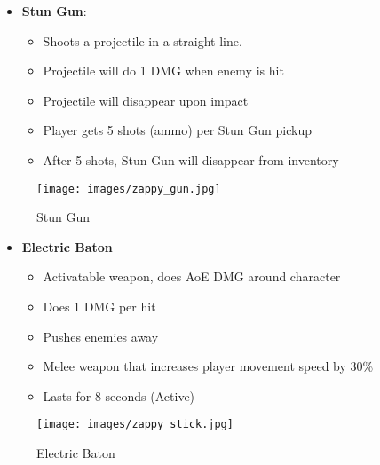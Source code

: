 \documentclass[10pt]{report}
\begin{document}
\begin{minipage}{.8\linewidth}
    \begin{itemize}
        \item \textbf{Stun Gun}:
        \begin{itemize}
            \item Shoots a projectile in a straight line.
            \item Projectile will do 1 DMG when enemy is hit 
            \item Projectile will disappear upon impact
            \item Player gets 5 shots (ammo) per Stun Gun pickup
            \item After 5 shots, Stun Gun will disappear from inventory
        \end{itemize}
    \end{itemize}
\end{minipage} \hfill
\begin{minipage}{.18\linewidth}
    \begin{figure}[H]
        \centering
        \texttt{[image: images/zappy\_gun.jpg]}
        \caption{Stun Gun}
    \end{figure}
\end{minipage}

\begin{minipage}{.8\linewidth}
    \begin{itemize}
        \item \textbf{Electric Baton}
        \begin{itemize}
            \item Activatable weapon, does AoE DMG around character
            \item Does 1 DMG per hit
            \item Pushes enemies away
            \item Melee weapon that increases player movement speed by 30\%
            \item Lasts for 8 seconds (Active)
        \end{itemize}
    \end{itemize}
\end{minipage} \hfill
\begin{minipage}{.18\linewidth}
    \begin{figure}[H]
        \centering
        \texttt{[image: images/zappy\_stick.jpg]}
        \caption{Electric Baton}
    \end{figure}
\end{minipage}
    
\end{document}

